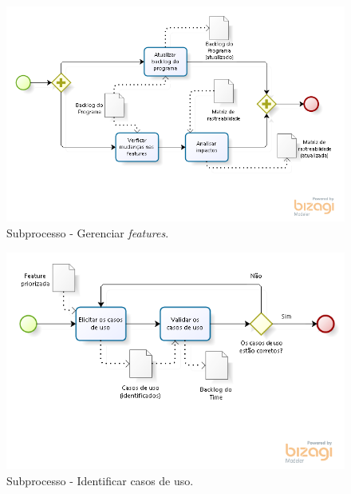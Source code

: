     \begin{figure}[!htbp]
      \centering
      \includegraphics[scale=0.55]{editaveis/figuras/processo_gerenciar_features}
      \caption[Subprocesso - Gerenciar \textit{features}]{Subprocesso - Gerenciar \textit{features}.}
      \label{processo_gerenciar_features}
    \end{figure}

    \begin{figure}[!htbp]
      \centering
      \includegraphics[scale=0.5]{editaveis/figuras/processo_identificar_casos_uso}
      \caption[Subprocesso - Identificar casos de uso]{Subprocesso - Identificar casos de uso.}
      \label{processo_identificar_casos_uso}
    \end{figure}
    
